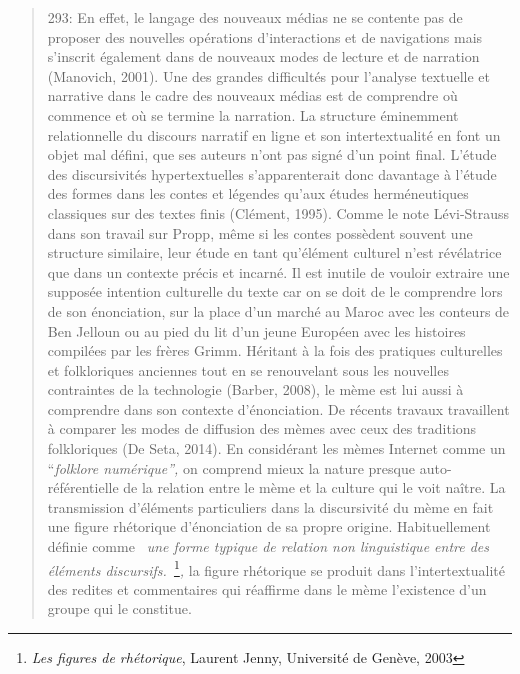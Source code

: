 \begin{quote}
293: En effet, le langage des nouveaux m\'edias ne se contente pas de proposer des nouvelles op\'erations d{\textquoteright}interactions et de navigations mais s{\textquoteright}inscrit \'egalement dans de nouveaux modes de lecture et de narration (Manovich, 2001). Une des grandes difficult\'es pour l{\textquoteright}analyse textuelle et narrative dans le cadre des nouveaux m\'edias est de comprendre o\`u commence et o\`u se termine la narration. La structure \'eminemment relationnelle du discours narratif en ligne et son intertextualit\'e en font un objet mal d\'efini, que ses auteurs n{\textquoteright}ont pas sign\'e d{\textquoteright}un point final. L{\textquoteright}\'etude des discursivit\'es hypertextuelles s{\textquoteright}apparenterait donc davantage \`a l{\textquoteright}\'etude des formes dans les contes et l\'egendes qu{\textquoteright}aux \'etudes herm\'eneutiques classiques sur des textes finis (Cl\'ement, 1995). Comme le note L\'evi-Strauss dans son travail sur Propp, m\^eme si les contes poss\`edent souvent une structure similaire, leur \'etude en tant qu{\textquoteright}\'el\'ement culturel n{\textquoteright}est r\'ev\'elatrice que dans un contexte pr\'ecis et incarn\'e. Il est inutile de vouloir extraire une suppos\'ee intention culturelle du texte car on se doit de le comprendre lors de son \'enonciation, sur la place d{\textquoteright}un march\'e au Maroc avec les conteurs de Ben Jelloun ou au pied du lit d{\textquoteright}un jeune Europ\'een avec les histoires compil\'ees par les fr\`eres Grimm. H\'eritant \`a la fois des pratiques culturelles et folkloriques anciennes tout en se renouvelant sous les nouvelles contraintes de la technologie (Barber, 2008), le m\`eme est lui aussi \`a comprendre dans son contexte d{\textquoteright}\'enonciation. De r\'ecents travaux travaillent \`a comparer les modes de diffusion des m\`emes avec ceux des traditions folkloriques (De Seta, 2014). En consid\'erant les m\`emes Internet comme un {\textquotedblleft}\textit{folklore num\'erique{\textquotedblright}, }on comprend mieux la nature presque auto-r\'ef\'erentielle de la relation entre le m\`eme et la culture qui le voit na\^itre. La transmission d{\textquoteright}\'el\'ements particuliers dans la discursivit\'e du m\`eme en fait une figure rh\'etorique d{\textquoteright}\'enonciation de sa propre origine. Habituellement d\'efinie comme \textit{{\guillemotleft}~une forme typique de relation non linguistique entre des \'el\'ements discursifs.~{\guillemotright}}\footnote{ \textit{Les figures de rh\'etorique}, Laurent Jenny, Universit\'e de Gen\`eve, 2003}\textit{, }la figure rh\'etorique se produit dans l{\textquoteright}intertextualit\'e des redites et commentaires qui r\'eaffirme dans le m\`eme l{\textquoteright}existence d{\textquoteright}un groupe qui le constitue.  

\end{quote}
